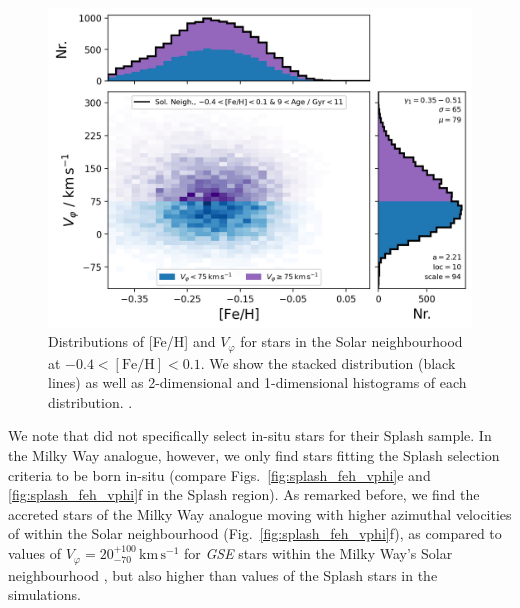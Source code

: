 \documentclass[fleqn,usenatbib]{mnras}
\begin{document}
\begin{figure}
    \centering
    \includegraphics[width=0.9\columnwidth]{figures/splash_vphi_distribution.png}
    \caption{Distributions of [Fe/H] and $V_\varphi$ for stars in the Solar neighbourhood at $-0.4 < \mathrm{[Fe/H]} < 0.1$. We show the stacked distribution (black lines) as well as 2-dimensional and 1-dimensional histograms of each distribution.
    \href{https://github.com/svenbuder/gse_nihaouhd/tree/main/figures}{\faGithub}.}
    \label{fig:splash_vphi_distribution}
\end{figure}

We note that \citet{Belokurov2020} did not specifically select in-situ stars for their Splash sample. In the Milky Way analogue, however, we only find stars fitting the Splash selection criteria to be born in-situ (compare Figs.~\ref{fig:splash_feh_vphi}e and \ref{fig:splash_feh_vphi}f in the Splash region). As remarked before, we find the accreted stars of the Milky Way analogue moving with higher azimuthal velocities of  within the Solar neighbourhood (Fig.~\ref{fig:splash_feh_vphi}f), as compared to values of $V_\varphi = 20_{-70}^{+100}\,\mathrm{km\,s^{-1}}$ for \textit{GSE} stars within the Milky Way's Solar neighbourhood \citep{Buder2022}, but also higher than values of the Splash stars in the simulations.
\end{document}
